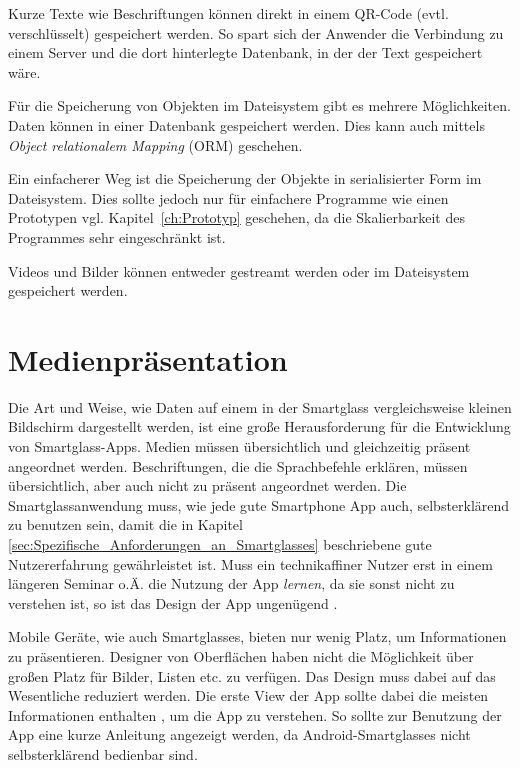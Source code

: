 Kurze Texte wie Beschriftungen können direkt in einem QR-Code (evtl. verschlüsselt) gespeichert werden. So spart sich der Anwender die Verbindung zu einem Server und die dort hinterlegte Datenbank, in der der Text gespeichert wäre.

Für die Speicherung von Objekten im Dateisystem gibt es mehrere Möglichkeiten. Daten können in einer Datenbank gespeichert werden. Dies kann auch mittels \emph{Object relationalem Mapping} (ORM) geschehen.

Ein einfacherer Weg ist die Speicherung der Objekte in serialisierter Form im Dateisystem. Dies sollte jedoch nur für einfachere Programme wie einen Prototypen vgl. Kapitel~\ref{ch:Prototyp} geschehen, da die Skalierbarkeit des Programmes sehr eingeschränkt ist.

Videos und Bilder können entweder gestreamt werden oder im Dateisystem gespeichert werden.
%
%
%
%
%
%
\section{Medienpräsentation}
\label{sec:Medienpraesentation}
Die Art und Weise, wie Daten auf einem in der Smartglass vergleichsweise kleinen Bildschirm dargestellt werden, ist eine große Herausforderung für die Entwicklung von Smartglass-Apps. Medien müssen übersichtlich und gleichzeitig präsent angeordnet werden. Beschriftungen, die die Sprachbefehle erklären, müssen übersichtlich, aber auch nicht zu präsent angeordnet werden. Die Smartglassanwendung muss, wie jede gute Smartphone App auch, selbsterklärend zu benutzen sein, damit die in Kapitel \ref{sec:Spezifische_Anforderungen_an_Smartglasses} beschriebene gute Nutzererfahrung gewährleistet ist. 
Muss ein technikaffiner Nutzer erst in einem längeren Seminar o.Ä. die Nutzung der App \emph{lernen}, da sie sonst nicht zu verstehen ist, so ist das Design der App ungenügend \cite{Hoober2011} \cite[S.~141ff]{Norman2013}.

Mobile Geräte, wie auch Smartglasses, bieten nur wenig Platz, um Informationen zu präsentieren. Designer von Oberflächen haben nicht die Möglichkeit über großen Platz für Bilder, Listen etc. zu verfügen. Das Design muss dabei auf das Wesentliche reduziert werden. Die erste View der App sollte dabei die meisten Informationen enthalten \cite[S.~442]{Tidwell2005}, um die App zu verstehen. So sollte zur Benutzung der App eine kurze Anleitung angezeigt werden, da Android-Smartglasses nicht selbsterklärend bedienbar sind.

